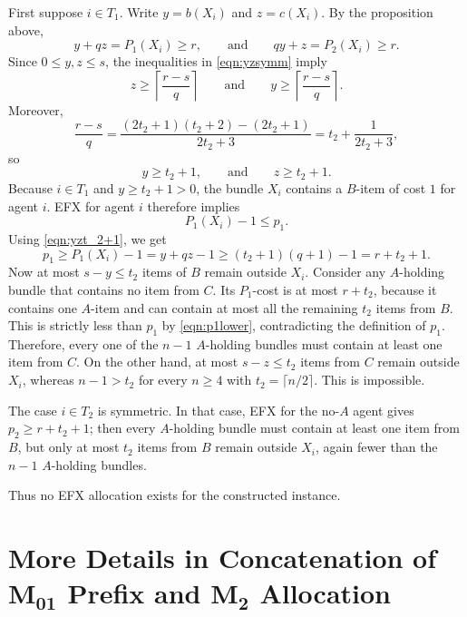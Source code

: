 \documentclass{article}
\theoremstyle{definition}
\begin{document}
First suppose $i\in T_1$. Write $y=b(X_i)$ and $z=c(X_i)$.
By the proposition above,
\begin{equation}\label{eqn:yzsymm}
    y+q z=P_1(X_i)\ge r,
    \qquad\mbox{and}\qquad
    q y+z=P_2(X_i)\ge r. 
\end{equation}
Since $0\le y,z\le s$, the inequalities in \eqref{eqn:yzsymm} imply
\[
    z\ge \left\lceil \frac{r-s}{q}\right\rceil
    \qquad\text{and}\qquad
    y\ge \left\lceil \frac{r-s}{q}\right\rceil.
\]
Moreover,
\[
    \frac{r-s}{q}
    =\frac{(2t_2+1)(t_2+2)-(2t_2+1)}{2t_2+3}
    =t_2+\frac{1}{2t_2+3},
\]
so
\begin{equation}\label{eqn:yzt_2+1}
    y\ge t_2+1,
    \qquad\mbox{and}\qquad
    z\ge t_2+1.  
\end{equation}
Because $i\in T_1$ and $y\ge t_2+1>0$, the bundle $X_i$ contains a $B$-item of cost $1$ for agent $i$. 
EFX for agent $i$ therefore implies
\[
    P_1(X_i)-1\le p_1.
\]
Using \eqref{eqn:yzt_2+1}, we get
\begin{equation}\label{eqn:p1lower}
    p_1\ge P_1(X_i)-1
    =y+q z-1
    \ge (t_2+1)(q+1)-1
    =r+t_2+1.   
\end{equation}
Now at most $s-y\le t_2$ items of $B$ remain outside $X_i$. Consider any $A$-holding bundle that contains no item from $C$. 
Its $P_1$-cost is at most $r+t_2$, because it contains one $A$-item and can contain at most all the remaining $t_2$ items from $B$. This is strictly less than $p_1$ by \eqref{eqn:p1lower}, contradicting the definition of $p_1$. Therefore, every one of the $n-1$ $A$-holding bundles must contain at least one item from $C$.
On the other hand, at most $s-z\le t_2$ items from $C$ remain outside $X_i$, whereas
$n-1>t_2$
for every $n\ge 4$ with $t_2=\lceil n/2\rceil$. 
This is impossible.

The case $i\in T_2$ is symmetric. In that case, EFX for the no-$A$ agent gives $p_2\ge r+t_2+1$; then every $A$-holding bundle must contain at least one item from $B$, but only at most $t_2$ items from $B$ remain outside $X_i$, again fewer than the $n-1$ $A$-holding bundles.

Thus no EFX allocation exists for the constructed instance.


\section{More Details in Concatenation of $\boldsymbol{M_{01}}$ Prefix and $\boldsymbol{M_2}$ Allocation}
\label{append:concatenation}
\end{document}
